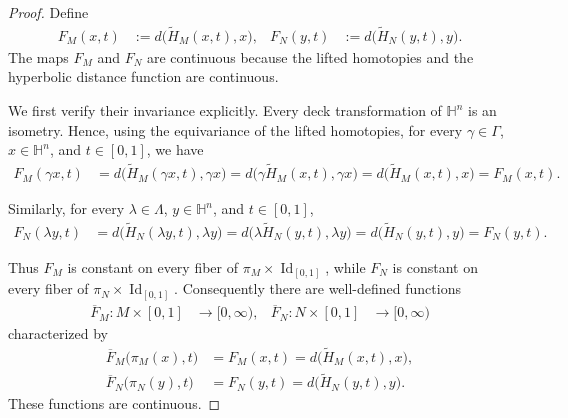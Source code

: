 \documentclass[11pt]{amsart}
\theoremstyle{plain}
\theoremstyle{plain}
\theoremstyle{plain}
\newcommand{\Id}{\operatorname{Id}}
\numberwithin{equation}{section}
\begin{document}
\begin{proof}
Define
\begin{align}
F_M(x,t)&:=d\bigl(\widetilde H_M(x,t),x\bigr),
&
F_N(y,t)&:=d\bigl(\widetilde H_N(y,t),y\bigr).
\nonumber
\end{align}
The maps \(F_M\) and \(F_N\) are continuous because the lifted
homotopies and the hyperbolic distance function are continuous.

We first verify their invariance explicitly.  Every deck
transformation of \(\mathbb H^n\) is an isometry.  Hence, using the
equivariance of the lifted homotopies, for every
\(\gamma\in\Gamma\), \(x\in\mathbb H^n\), and \(t\in[0,1]\), we have
\begin{align}
F_M(\gamma x,t)&=d\bigl(\widetilde H_M(\gamma x,t),\gamma x\bigr)=d\bigl(\gamma\widetilde H_M(x,t),\gamma x\bigr)
=d\bigl(\widetilde H_M(x,t),x\bigr)=F_M(x,t).
\nonumber
\end{align}

Similarly, for every \(\lambda\in\Lambda\),
\(y\in\mathbb H^n\), and \(t\in[0,1]\),
\begin{align}
F_N(\lambda y,t)&=d\bigl(\widetilde H_N(\lambda y,t),\lambda y\bigr)=d\bigl(\lambda\widetilde H_N(y,t),\lambda y\bigr)=d\bigl(\widetilde H_N(y,t),y\bigr)
=F_N(y,t).
\nonumber
\end{align}

Thus \(F_M\) is constant on every fiber of
\(\pi_M\times\Id_{[0,1]}\), while \(F_N\) is constant on every fiber
of \(\pi_N\times\Id_{[0,1]}\).  Consequently there are well-defined
functions
\begin{align}
\overline F_M:M\times[0,1]&\longrightarrow[0,\infty),
&
\overline F_N:N\times[0,1]&\longrightarrow[0,\infty)
\nonumber
\end{align}
characterized by
\begin{align}
\overline F_M\bigl(\pi_M(x),t\bigr)
&=F_M(x,t)
=d\bigl(\widetilde H_M(x,t),x\bigr),
\nonumber\\
\overline F_N\bigl(\pi_N(y),t\bigr)
&=F_N(y,t)
=d\bigl(\widetilde H_N(y,t),y\bigr).
\nonumber
\end{align}
These functions are continuous.  


\end{proof}
\end{document}
